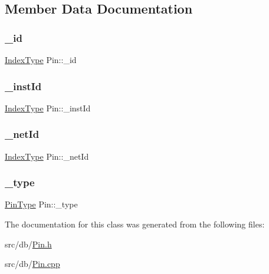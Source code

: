 \subsection{Member Data Documentation}
\mbox{\label{classPin_ad40a8453e8fa16e12e17f661bfc36f69}} 
\subsubsection{\texorpdfstring{\+\_\+id}{\_id}}
{\footnotesize\ttfamily \hyperlink{type_8h_a581e8093e28e7362f2b6937296190676}{Index\+Type} Pin\+::\+\_\+id\hspace{0.3cm}{\ttfamily [private]}}

\mbox{\label{classPin_aa9bd5211cedd081a572476545f5bf498}} 
\subsubsection{\texorpdfstring{\+\_\+inst\+Id}{\_instId}}
{\footnotesize\ttfamily \hyperlink{type_8h_a581e8093e28e7362f2b6937296190676}{Index\+Type} Pin\+::\+\_\+inst\+Id\hspace{0.3cm}{\ttfamily [private]}}

\mbox{\label{classPin_a703ff6aea39f28b40e7d5d4dfb708a67}} 
\subsubsection{\texorpdfstring{\+\_\+net\+Id}{\_netId}}
{\footnotesize\ttfamily \hyperlink{type_8h_a581e8093e28e7362f2b6937296190676}{Index\+Type} Pin\+::\+\_\+net\+Id\hspace{0.3cm}{\ttfamily [private]}}

\mbox{\label{classPin_a0a660d777203aca04685f4cdf6623f72}} 
\subsubsection{\texorpdfstring{\+\_\+type}{\_type}}
{\footnotesize\ttfamily \hyperlink{type_8h_afaab50027002ecbb6c8ac27e727d1bb4}{Pin\+Type} Pin\+::\+\_\+type\hspace{0.3cm}{\ttfamily [private]}}



The documentation for this class was generated from the following files\+:\begin{DoxyCompactItemize}
\item 
src/db/\hyperlink{Pin_8h}{Pin.\+h}\item 
src/db/\hyperlink{Pin_8cpp}{Pin.\+cpp}\end{DoxyCompactItemize}

